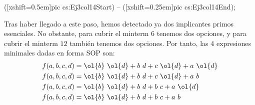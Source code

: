 \begin{ejercicio}
\begin{description}
\begin{table}[H]
              ([xshift=0.5em]pic cs:Ej3col14Start) -- ([xshift=0.25em]pic cs:Ej3col14End);
        \end{table}

        Tras haber llegado a este paso, hemos detectado ya dos implicantes primos esenciales. No obstante, para cubrir el minterm $6$ tenemos dos opciones,
        y para cubrir el minterm $12$ también tenemos dos opciones. Por tanto, las 4 expresiones minimales dadas en forma SOP son:
        \begin{align*}
            f(a,b,c,d) &= \ol{b}~\ol{d} + b~d + c~\ol{d} + a~\ol{d}\\
            f(a,b,c,d) &= \ol{b}~\ol{d} + b~d + c~\ol{d} + a~b\\
            f(a,b,c,d) &= \ol{b}~\ol{d} + b~d + b~c + a~\ol{d}\\
            f(a,b,c,d) &= \ol{b}~\ol{d} + b~d + b~c + a~b
        \end{align*}
    \end{description}
\end{ejercicio}


